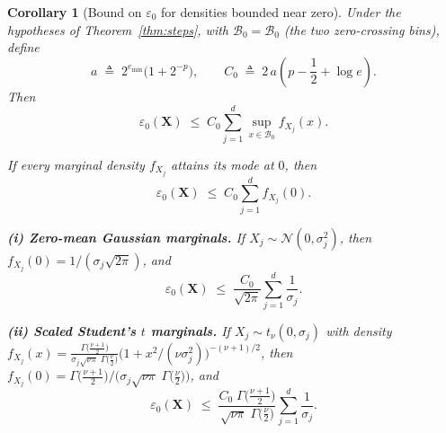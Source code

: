 \documentclass[12pt,onecolumn, margin=1in]{IEEEtran}
\newtheorem{corollary}{Corollary}[theorem]
\begin{document}
\begin{corollary}[Bound on $\varepsilon_{0}$ for densities bounded near zero]
\label{cor:eps_sp_bound}
Under the hypotheses of Theorem~\ref{thm:steps}, with
$\mathcal{B}_{0} = \mathcal{B}_0$ (the two zero-crossing bins),
define
\begin{equation}
  a \;\triangleq\; 2^{e_{\min}}\bigl(1 + 2^{-p}\bigr),
  \qquad
  C_0 \;\triangleq\; 2\,a\left(p - \frac{1}{2} + \log e\right).
\end{equation}
Then
\begin{equation}
\label{eq:eps_sp_general}
  \varepsilon_{0}(\mathbf{X})
  \;\le\;
  C_0
  \sum_{j=1}^{d}
  \sup_{x \in \mathcal{B}_0} f_{X_j}(x).
\end{equation}
 
If every marginal density $f_{X_j}$ attains its mode at $0$,
then
\begin{equation}
\label{eq:eps_sp_mode}
  \varepsilon_{0}(\mathbf{X})
  \;\le\;
  C_0
  \sum_{j=1}^{d} f_{X_j}(0).
\end{equation}
 
\medskip
\noindent\textbf{(i)\; Zero-mean Gaussian marginals.}\;
If $X_j \sim \mathcal{N}(0,\sigma_j^2)$, then $f_{X_j}(0) = 1/(\sigma_j\sqrt{2\pi})$, and
\begin{equation}
\label{eq:eps_sp_gauss}
  \varepsilon_{0}(\mathbf{X})
  \;\le\;
  \frac{C_0}{\sqrt{2\pi}}
  \sum_{j=1}^{d} \frac{1}{\sigma_j}.
\end{equation}
 
\noindent\textbf{(ii)\; Scaled Student's $t$ marginals.}\;
If $X_j \sim t_\nu(0,\sigma_j)$ with density
$f_{X_j}(x)
= \frac{\Gamma\bigl(\frac{\nu+1}{2}\bigr)}
       {\sigma_j\sqrt{\nu\pi}\;\Gamma\bigl(\frac{\nu}{2}\bigr)}
  \bigl(1 + x^2/(\nu\sigma_j^2)\bigr)^{-(\nu+1)/2}$,
then $f_{X_j}(0) = \Gamma\bigl(\frac{\nu+1}{2}\bigr)
  \big/\bigl(\sigma_j\sqrt{\nu\pi}\;\Gamma\bigl(\frac{\nu}{2}\bigr)\bigr)$, and
\begin{equation}
\label{eq:eps_sp_student}
  \varepsilon_{0}(\mathbf{X})
  \;\leq\;
  \frac{C_0\;\Gamma\bigl(\frac{\nu+1}{2}\bigr)}
       {\sqrt{\nu\pi}\;\Gamma\bigl(\frac{\nu}{2}\bigr)}
  \sum_{j=1}^{d} \frac{1}{\sigma_j}.
\end{equation}
\end{corollary}
 
\end{document}
